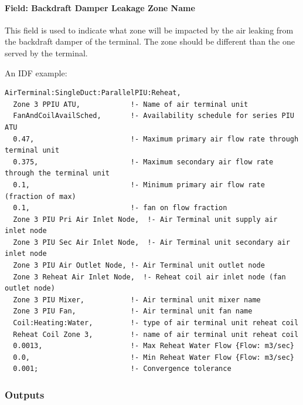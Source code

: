 \paragraph{Field: Backdraft Damper Leakage Zone Name}\label{field-backdraft_damper_leakage_zone_name}

This field is used to indicate what zone will be impacted by the air leaking from the backdraft damper of the terminal. The zone should be different than the one served by the terminal.

An IDF example:

\begin{lstlisting}
AirTerminal:SingleDuct:ParallelPIU:Reheat,
  Zone 3 PPIU ATU,            !- Name of air terminal unit
  FanAndCoilAvailSched,       !- Availability schedule for series PIU ATU
  0.47,                       !- Maximum primary air flow rate through terminal unit
  0.375,                      !- Maximum secondary air flow rate through the terminal unit
  0.1,                        !- Minimum primary air flow rate (fraction of max)
  0.1,                        !- fan on flow fraction
  Zone 3 PIU Pri Air Inlet Node,  !- Air Terminal unit supply air inlet node
  Zone 3 PIU Sec Air Inlet Node,  !- Air Terminal unit secondary air inlet node
  Zone 3 PIU Air Outlet Node, !- Air Terminal unit outlet node
  Zone 3 Reheat Air Inlet Node,  !- Reheat coil air inlet node (fan outlet node)
  Zone 3 PIU Mixer,           !- Air terminal unit mixer name
  Zone 3 PIU Fan,             !- Air terminal unit fan name
  Coil:Heating:Water,         !- type of air terminal unit reheat coil
  Reheat Coil Zone 3,         !- name of air terminal unit reheat coil
  0.0013,                     !- Max Reheat Water Flow {Flow: m3/sec}
  0.0,                        !- Min Reheat Water Flow {Flow: m3/sec}
  0.001;                      !- Convergence tolerance
\end{lstlisting}

\subsubsection{Outputs}\label{outputs-8}

